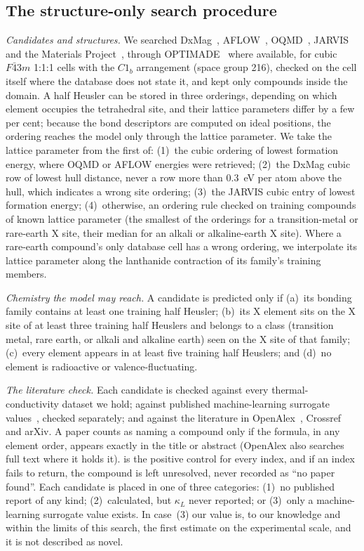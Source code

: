 \documentclass[preprint, 12pt]{elsarticle}
\begin{document}
\subsection*{The structure-only search procedure}

\emph{Candidates and structures.} We searched DxMag~\cite{xiao2025highthroug},
AFLOW~\cite{curtarolo2012aflow}, OQMD~\cite{kirklin2015the}, JARVIS~\cite{choudhary2020the} and the
Materials Project~\cite{jain2013commentary}, through OPTIMADE~\cite{andersen2021optimade} where
available, for cubic $F\bar{4}3m$ 1:1:1 cells with the $C1_b$ arrangement (space group 216), checked on
the cell itself where the database does not state it, and kept only compounds inside the domain. A
half Heusler can be stored in three orderings, depending on which element occupies the tetrahedral
site, and their lattice parameters differ by a few per cent; because the bond descriptors are
computed on ideal positions, the ordering reaches the model only through the lattice parameter. We
take the lattice parameter from the first of: (1)~the cubic ordering of lowest formation energy,
where OQMD or AFLOW energies were retrieved; (2)~the DxMag cubic row of lowest hull distance, never a
row more than \SI{0.3}{\electronvolt} per atom above the hull, which indicates a wrong site ordering;
(3)~the JARVIS cubic entry of lowest formation energy; (4)~otherwise, an ordering rule checked on
training compounds of known lattice parameter (the smallest of the orderings for a transition-metal
or rare-earth X site, their median for an alkali or alkaline-earth X site). Where a rare-earth
compound's only database cell has a wrong ordering, we interpolate its lattice parameter along the
lanthanide contraction of its family's training members.

\emph{Chemistry the model may reach.} A candidate is predicted only if (a)~its bonding family
contains at least one training half Heusler; (b)~its X element sits on the X site of at least three
training half Heuslers and belongs to a class (transition metal, rare earth, or alkali and alkaline
earth) seen on the X site of that family; (c)~every element appears in at least five training half
Heuslers; and (d)~no element is radioactive or valence-fluctuating.

\emph{The literature check.} Each candidate is checked against every thermal-conductivity dataset we
hold; against published machine-learning surrogate values~\cite{rodriguez2023millionsca}, checked
separately; and against the literature in OpenAlex~\cite{priem2022openalex}, Crossref and arXiv. A
paper counts as naming a compound only if the formula, in any element order, appears exactly in the
title or abstract (OpenAlex also searches full text where it holds it).  is the positive
control for every index, and if an index fails to return, the compound is left unresolved, never
recorded as ``no paper found''. Each candidate is placed in one of three categories: (1)~no published
report of any kind; (2)~calculated, but $\kappa_L$ never reported; or (3)~only a machine-learning
surrogate value exists. In case~(3) our value is, to our knowledge and within the limits of this
search, the first estimate on the experimental scale, and it is not described as novel.
\end{document}
